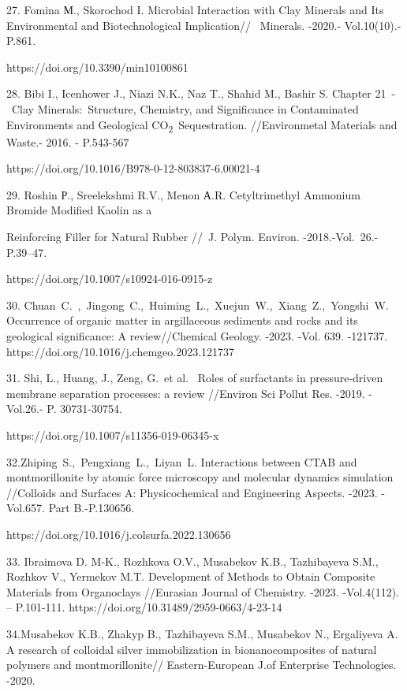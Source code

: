 \begin{noparindent}
27. Fomina М., Skorochod I. Microbial Interaction with Clay Minerals and
Its Environmental and Biotechnological Implication//~ Minerals. -2020.-
Vol.10(10).- P.861.

https://doi.org/10.3390/min10100861

28. Bibi I., Icenhower J., Niazi N.K., Naz T., Shahid M., Bashir S.
Chapter 21~-~Clay Minerals:~Structure, Chemistry, and Significance in
Contaminated Environments and Geological
CO\textsubscript{2}~Sequestration. //Environmetal Materials and Waste.-
2016. - P.543-567

https://doi.org/10.1016/B978-0-12-803837-6.00021-4

29. Roshin Р., Sreelekshmi R.V., Menon А.R. Cetyltrimethyl Ammonium
Bromide Modified Kaolin as a

Reinforcing Filler for Natural Rubber //~J.
Polym. Environ. -2018.-Vol.~26.- P.39--47.

https://doi.org/10.1007/s10924-016-0915-z

30. Chuan~C.~,~Jingong~C.,~Huiming~L.,~Xuejun~W.,~Xiang~Z.,~Yongshi~W.
Occurrence of organic matter in argillaceous sediments and rocks and its
geological significance: A review//Chemical Geology. -2023. -Vol. 639.
-121737. https://doi.org/10.1016/j.chemgeo.2023.121737

31. Shi, L., Huang, J., Zeng, G.~et al.~ Roles of surfactants in
pressure-driven membrane separation processes: a review //Environ Sci
Pollut Res. -2019. -Vol.26.- P. 30731-30754.

https://doi.org/10.1007/s11356-019-06345-x

32.Zhiping~S.,~Pengxiang~L.,~Liyan~L. Interactions between CTAB and
montmorillonite by atomic force microscopy and molecular dynamics
simulation //Colloids and Surfaces A: Physicochemical and Engineering
Aspects. -2023. -Vol.657. Part B.-P.130656.

https://doi.org/10.1016/j.colsurfa.2022.130656

33. Ibraimova D. M-K., Rozhkova O.V., Musabekov K.B., Tazhibayeva S.M.,
Rozhkov V., Yermekov M.T. Development of Methods to Obtain Composite
Materials from Organoclays //Eurasian Journal of Chemistry. -2023.
-Vol.4(112). -- P.101-111. https://doi.org/10.31489/2959-0663/4-23-14

34.Musabekov K.B., Zhakyp B., Tazhibayeva S.M., Musabekov N., Ergaliyeva
A. A research of colloidal silver immobilization in bionanocomposites of
natural polymers and montmorillonite// Eastern-European J.of Enterprise
Technologies. -2020.


\end{noparindent}
